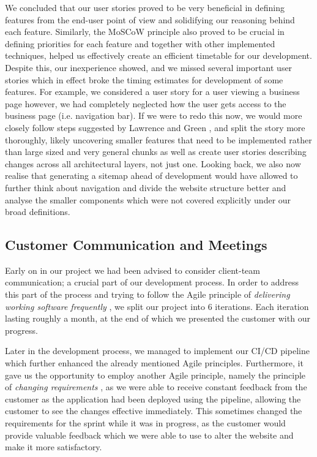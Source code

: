 \documentclass{l3proj}
\begin{document}
        We concluded that our user stories proved to be very beneficial in defining features from the end-user point of view and solidifying our reasoning behind each feature. Similarly, the MoSCoW principle also proved to be crucial in defining priorities for each feature and together with other implemented techniques, helped us effectively create an efficient timetable for our development. Despite this, our inexperience showed, and we missed several important user stories which in effect broke the timing estimates for development of some features. For example, we considered a user story for a user viewing a business page however, we had completely neglected how the user gets access to the business page (i.e. navigation bar). If we were to redo this now, we would more closely follow steps suggested by Lawrence and Green \cite{stories}, and split the story more thoroughly, likely uncovering smaller features that need to be implemented rather than large sized and very general chunks as well as create user stories describing changes across all architectural layers, not just one. Looking back, we also now realise that generating a sitemap \cite{map} ahead of development would have allowed to further think about navigation and divide the website structure better and analyse the smaller components which were not covered explicitly under our broad definitions.
    
    \subsection{Customer Communication and Meetings}
    \label{sec:communication}
        Early on in our project we had been advised to consider client-team communication; a crucial part of our development process. In order to address this part of the process and trying to follow the Agile principle of \textit{delivering working
        software frequently} \cite{manifesto}, we split our project into 6 iterations. Each iteration lasting roughly a month, at the end of which we presented the customer with our progress.

        Later in the development process, we managed to implement our CI/CD pipeline which further enhanced the already mentioned Agile principles. Furthermore, it gave us the opportunity to employ another Agile principle, namely the principle of \textit{changing requirements} \cite{manifesto}, as we were able to receive constant feedback from the customer as the application had been deployed using the pipeline, allowing the customer to see the changes effective immediately. This sometimes changed the requirements for the sprint while it was in progress, as the customer would provide valuable feedback which we were able to use to alter the website and make it more satisfactory.
\end{document}
